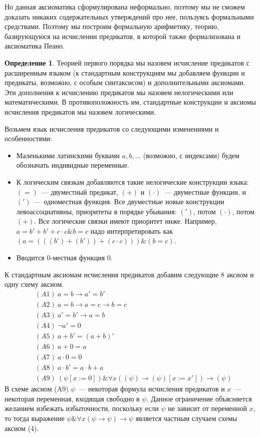 \documentclass[a4paper,11pt]{article}
\theoremstyle{definition}
\newtheorem{dfn}[thm]{Определение}
\newcommand{\amp}{\mathbin{\&}}
\begin{document}
Но данная аксиоматика сформулирована неформально, поэтому мы не сможем доказать
никаких содержательных утверждений про нее, пользуясь формальными средствами.
Поэтому мы построим формальную арифметику, теорию, базирующуюся на исчислении
предикатов, в которой также формализована и аксиоматика Пеано.

\begin{dfn}
Теорией первого порядка мы назовем исчисление предикатов с расширенным языком (к
стандартным конструкциям мы добавляем функции и предикаты, возможно, с особым
синтаксисом) и дополнительными аксиомами. Эти дополнения к исчислению
предикатов мы назовем нелогическими или математическими. В противоположность им,
стандартные конструкции и аксиомы исчисления предикатов мы назовем логическими.
\end{dfn}

Возьмем язык исчисления предикатов со следующими изменениями и особенностями:
\begin{itemize}
\item Маленькими латинскими буквами $a, b, \dots$ (возможно, с индексами) будем
  обозначать индивидные переменные.
\item К логическим связкам добавляются такие нелогические конструкции языка:
  $(=)$~--- двуместный предикат, $(+)$ и $(\cdot)$~--- двуместные функции, и
  $(')$~--- одноместная функция. Все двуместные новые конструкции
  левоассоциативны, приоритеты в порядке убывания: $(')$, потом $(\cdot)$,
  потом $(+)$. Все логические связки имеют приоритет ниже. Например,
  $a = b' + b' + c \cdot c \amp b = c$ надо интерпретировать как $(a = (((b') +
  (b')) + (c \cdot c))) \amp (b = c)$.
\item Вводится 0-местная функция $0$.
\end{itemize}

К стандартным аксиомам исчисления предикатов добавим следующие 8 аксиом и одну
схему аксиом.
\begin{align*}
&(A1)\ a = b \to a' = b'\\
&(A2)\ a = b \to a = c \to b = c\\
&(A3)\ a' = b' \to a = b\\
&(A4)\ \neg a' = 0\\
&(A5)\ a + b' = (a + b)'\\
&(A6)\ a + 0 = a\\
&(A7)\ a \cdot 0 = 0\\
&(A8)\ a \cdot b' = a \cdot b + a\\
&(A9)\ (\psi[x := 0]) \amp \forall x((\psi) \to (\psi)[x := x']) \to (\psi)
\end{align*}
В схеме аксиом (A9) $\psi$~--- некоторая формула исчисления предикатов и $x$~---
некоторая переменная, входящая свободно в $\psi$. Данное ограничение объясняется
желанием избежать избыточности, поскольку если $\psi$ не зависит от переменной
$x$, то тогда выражение $\psi \amp \forall x(\psi \to \psi) \to \psi$ является
частным случаем схемы аксиом (4).
\end{document}
